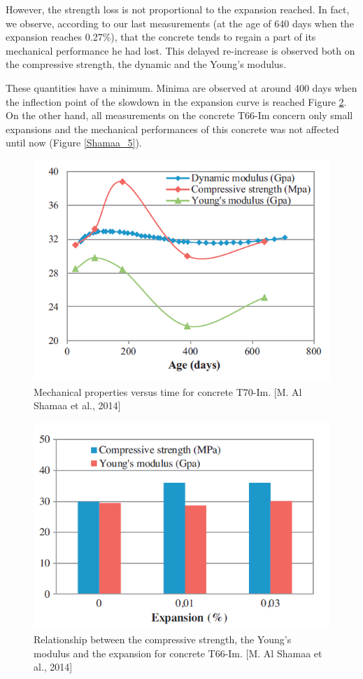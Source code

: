 However, the strength loss is not proportional to the expansion reached. In fact, we observe, according to our last measurements (at the age of 640 days when the expansion reaches 0.27\%), that the concrete tends to regain a part of its mechanical performance he had lost. This delayed re-increase is observed both on the compressive strength, the dynamic and the Young’s modulus.

These quantities have a minimum. Minima are observed at around 400 days when the inflection point of the slowdown in the expansion curve is reached Figure \ref{Shamaa_4}. On the other hand, all measurements on the concrete T66-Im concern only small expansions and the mechanical performances of this concrete was not affected until now (Figure \ref{Shamaa_5}).

\begin{figure}[h!]
  \centering
  \includegraphics[width=0.8\linewidth]{Reference/Shamaa4.png}
  \caption{Mechanical properties versus time for concrete T70-Im. [M. Al Shamaa et al., 2014]}
  \label{Shamaa_4}
\end{figure}

\begin{figure}[h!]
  \centering
  \includegraphics[width=0.8\linewidth]{Reference/Shamaa5.png}
  \caption{Relationship between the compressive strength, the Young’s modulus and
the expansion for concrete T66-Im. [M. Al Shamaa et al., 2014]}
  \label{Shamaa_4}
\end{figure}

